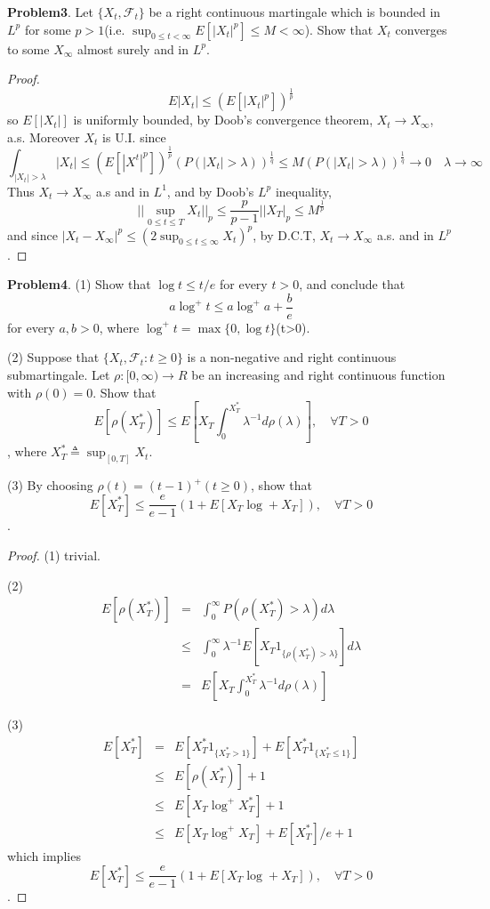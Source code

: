 \documentclass{article}     %
\begin{document}
\noindent 
\textbf{Problem3}. Let $\{X_t, \mathcal{F}_t\}$ be a right continuous martingale which is bounded in $L^p$ for some $p>1$(i.e. $\sup_{0\leq t<\infty}E[|X_t|^p]\leq M<\infty$). Show that $X_t$ converges to some $X_{\infty}$ almost surely and in $L^p$.


\begin{proof}
\[E|X_t|\leq (E[|X_t|^p])^{\frac{1}{p}}\]
so $E[|X_t|]$ is uniformly bounded, by Doob's convergence theorem, $X_t\rightarrow X_{\infty}$, a.s.
Moreover $X_t$ is U.I. since 
\[\int_{|X_t|>\lambda} |X_t|\leq \left(E[|X^t|^p]\right)^{\frac{1}{p}}\left(P(|X_t|>\lambda)\right)^{\frac{1}{q}}\leq M\left(P(|X_t|>\lambda)\right)^{\frac{1}{q}}\rightarrow 0\quad \lambda\rightarrow \infty\]
Thus $X_t\rightarrow X_{\infty}$ a.s and in $L^1$, and by Doob's $L^p$ inequality,
\[||\sup_{0\leq t\leq T}X_t||_p\leq \frac{p}{p-1}||X_T|_p\leq M^{\frac{1}{p}}\]
and since  $|X_t-X_{\infty}|^p\leq (2\sup_{0\leq t\leq \infty}X_t)^p$, by D.C.T, $X_t\rightarrow X_{\infty}$ a.s. and in $L^p$.


\end{proof}

\noindent
\textbf{Problem4}. (1) Show that $\log t\leq t/e$ for every $t>0$, and conclude that 
\[a\log^+t\leq a \log^+a +\frac{b}{e}\]
for every $a,b>0$, where $\log^+t=\max\{0,\log t\}$(t>0).

(2) Suppose that $\{X_t,\mathcal{F}_t:t\geq 0\}$ is a non-negative and right continuous submartingale. Let $\rho: [0,\infty)\rightarrow R$ be an increasing and right continuous function with $\rho(0)=0$. Show that 
\[E[\rho(X^*_T)]\leq E[X_T\int_0^{X^*_T}\lambda^{-1}d\rho(\lambda)], \quad \forall T>0\],
where $X^*_T\triangleq \sup_{[0,T]}X_t$.

(3) By choosing $\rho(t)=(t-1)^+(t\geq 0)$, show that 
\[E[X^*_T]\leq \frac{e}{e-1}(1+E[X_T\log+X_T]),\quad \forall T>0\].

\begin{proof}
(1) trivial.

(2) \begin{eqnarray*}
E[\rho(X^*_T)]& = &\int_0^{\infty}P(\rho(X^*_T)>\lambda)d\lambda\\
& \leq & \int_0^{\infty}\lambda^{-1}E[X_T1_{  \{\rho(X^*_T)>\lambda\}  }]d\lambda\\
& = &  E[X_T\int_0^{X^*_T}\lambda^{-1}d\rho(\lambda)]
\end{eqnarray*}

(3)\begin{eqnarray*}
E[X^*_T] & = & E[X^*_T1_{\{X^*_T>1\}}]+E[X^*_T1_{\{X^*_T\leq 1\}}]\\
& \leq & E[\rho(X^*_T)]+1\\
& \leq & E[X_T\log^+X_T^*]+1\\
& \leq & E[X_T\log^+ X_T]+E[X^*_T]/e +1
\end{eqnarray*}
which implies 
\[E[X^*_T]\leq \frac{e}{e-1}(1+E[X_T\log+X_T]),\quad \forall T>0\].

\end{proof}
\end{document}
